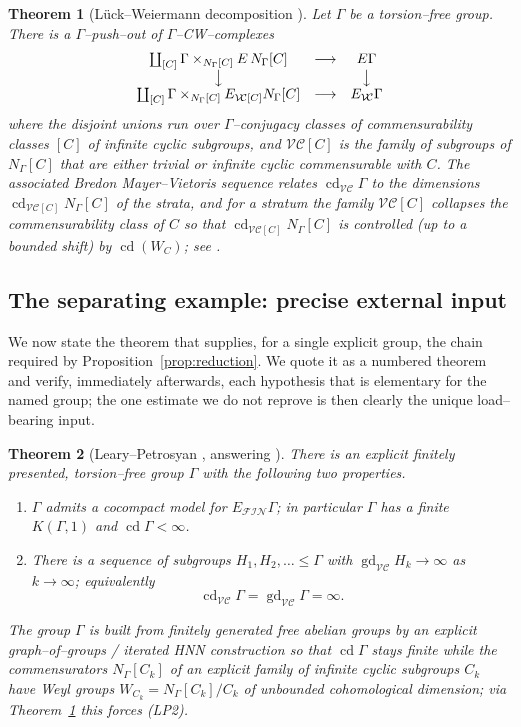 \documentclass{amsart}
\newtheorem{theorem}{Theorem}
\theoremstyle{definition}
\newcommand{\FIN}{\mathcal{F\!I\!N}}
\newcommand{\VC}{\mathcal{V\!C}}
\newcommand{\gd}{\operatorname{gd}}
\newcommand{\cd}{\operatorname{cd}}
\begin{document}
\begin{theorem}[Lück--Weiermann decomposition {\cite[Cor.~2.11, \S 5]{LueckWeiermann}}]\label{thm:LW}
Let $\Gamma$ be a torsion--free group. There is a $\Gamma$--push--out of
$\Gamma$--CW--complexes
\[
\begin{array}{ccc}
\coprod_{[C]} \Gamma\times_{N_\Gamma[C]} E\,N_\Gamma[C] & \longrightarrow & E\Gamma\\
\big\downarrow & & \big\downarrow\\
\coprod_{[C]} \Gamma\times_{N_\Gamma[C]} E_{\VC[C]}N_\Gamma[C] & \longrightarrow & E_{\VC}\Gamma
\end{array}
\]
where the disjoint unions run over $\Gamma$--conjugacy classes of commensurability classes
$[C]$ of infinite cyclic subgroups, and $\VC[C]$ is the family of subgroups of $N_\Gamma[C]$
that are either trivial or infinite cyclic commensurable with $C$. The associated Bredon
Mayer--Vietoris sequence relates $\cd_{\VC}\Gamma$ to the dimensions
$\cd_{\VC[C]}N_\Gamma[C]$ of the strata, and for a stratum the family $\VC[C]$ collapses the
commensurability class of $C$ so that $\cd_{\VC[C]}N_\Gamma[C]$ is controlled (up to a bounded
shift) by $\cd(W_C)$; see \cite[\S5]{LueckWeiermann}.
\end{theorem}

\subsection{The separating example: precise external input}

We now state the theorem that supplies, for a single explicit group, the chain required by
Proposition~\ref{prop:reduction}. We quote it as a numbered theorem and verify, immediately
afterwards, each hypothesis that is elementary for the named group; the one estimate we do not
reprove is then clearly the unique load--bearing input.

\begin{theorem}[Leary--Petrosyan {\cite[Theorem~B]{LearyPetrosyan}}, answering
{\cite{JPL}}]\label{thm:LP}
There is an explicit finitely presented, torsion--free group $\Gamma$ with the following two
properties.
\begin{enumerate}
\item[\textup{(LP1)}] $\Gamma$ admits a \emph{cocompact} model for $E_{\FIN}\Gamma$; in
particular $\Gamma$ has a finite $K(\Gamma,1)$ and $\cd\Gamma<\infty$.
\item[\textup{(LP2)}] There is a sequence of subgroups $H_1,H_2,\dots\le\Gamma$ with
$\gd_{\VC}H_k\to\infty$ as $k\to\infty$; equivalently
\[
\cd_{\VC}\Gamma=\gd_{\VC}\Gamma=\infty .
\]
\end{enumerate}
The group $\Gamma$ is built from finitely generated free abelian groups by an explicit
graph--of--groups / iterated HNN construction so that $\cd\Gamma$ stays finite while the
commensurators $N_\Gamma[C_k]$ of an explicit family of infinite cyclic subgroups $C_k$ have
Weyl groups $W_{C_k}=N_\Gamma[C_k]/C_k$ of unbounded cohomological dimension; via
Theorem~\ref{thm:LW} this forces \textup{(LP2)}.
\end{theorem}
\end{document}
